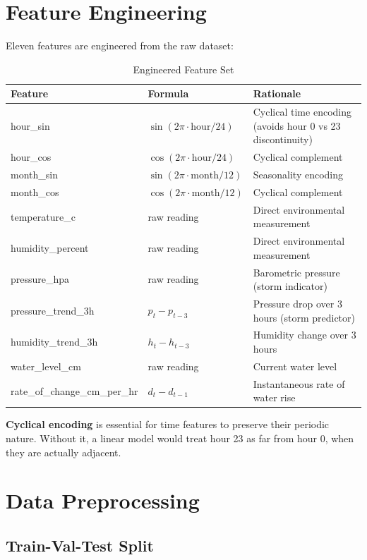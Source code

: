 \section{Feature Engineering}

Eleven features are engineered from the raw dataset:

\begin{table}[H]
\centering
\caption{Engineered Feature Set}
\begin{tabularx}{\linewidth}{|l|l|X|}
\hline
\rowcolor{FloodLight}
\textbf{Feature} & \textbf{Formula} & \textbf{Rationale} \\
\hline
hour\_sin & $\sin(2\pi \cdot \text{hour}/24)$ & Cyclical time encoding (avoids hour 0 vs 23 discontinuity) \\
hour\_cos & $\cos(2\pi \cdot \text{hour}/24)$ & Cyclical complement \\
month\_sin & $\sin(2\pi \cdot \text{month}/12)$ & Seasonality encoding \\
month\_cos & $\cos(2\pi \cdot \text{month}/12)$ & Cyclical complement \\
temperature\_c & raw reading & Direct environmental measurement \\
humidity\_percent & raw reading & Direct environmental measurement \\
pressure\_hpa & raw reading & Barometric pressure (storm indicator) \\
pressure\_trend\_3h & $p_t - p_{t-3}$ & Pressure drop over 3 hours (storm predictor) \\
humidity\_trend\_3h & $h_t - h_{t-3}$ & Humidity change over 3 hours \\
water\_level\_cm & raw reading & Current water level \\
rate\_of\_change\_cm\_per\_hr & $d_t - d_{t-1}$ & Instantaneous rate of water rise \\
\hline
\end{tabularx}
\end{table}

\textbf{Cyclical encoding} is essential for time features to preserve their periodic nature. Without it, a linear model would treat hour 23 as far from hour 0, when they are actually adjacent.

\section{Data Preprocessing}

\subsection{Train-Val-Test Split}

